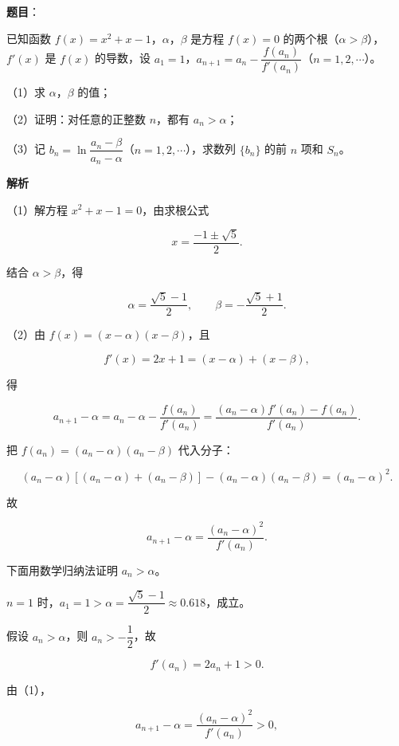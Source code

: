 \begin{answer}

\textbf{题目}：

已知函数 $f(x)=x^2+x-1$，$\alpha$，$\beta$ 是方程 $f(x)=0$ 的两个根（$\alpha>\beta$），$f'(x)$ 是 $f(x)$ 的导数，设 $a_1=1$，$a_{n+1}=a_n-\dfrac{f(a_n)}{f'(a_n)}$（$n=1,2,\cdots$）。

（1）求 $\alpha$，$\beta$ 的值；

（2）证明：对任意的正整数 $n$，都有 $a_n>\alpha$；

（3）记 $b_n=\ln\dfrac{a_n-\beta}{a_n-\alpha}$（$n=1,2,\cdots$），求数列 $\{b_n\}$ 的前 $n$ 项和 $S_n$。

\textbf{解析}

（1）解方程 $x^2+x-1=0$，由求根公式

\nopagebreak[4]
\[x=\frac{-1\pm\sqrt5}{2}.\]

结合 $\alpha>\beta$，得

\nopagebreak[4]
\[\alpha=\frac{\sqrt5-1}{2},\qquad \beta=-\frac{\sqrt5+1}{2}.\]

（2）由 $f(x)=(x-\alpha)(x-\beta)$，且

\nopagebreak[4]
\[f'(x)=2x+1=(x-\alpha)+(x-\beta),\]

得

\nopagebreak[4]
\[a_{n+1}-\alpha=a_n-\alpha-\frac{f(a_n)}{f'(a_n)}=\frac{(a_n-\alpha)f'(a_n)-f(a_n)}{f'(a_n)}.\]

把 $f(a_n)=(a_n-\alpha)(a_n-\beta)$ 代入分子：

\nopagebreak[4]
\[(a_n-\alpha)[(a_n-\alpha)+(a_n-\beta)]-(a_n-\alpha)(a_n-\beta)=(a_n-\alpha)^2.\]

故

\nopagebreak[4]
\[a_{n+1}-\alpha=\frac{(a_n-\alpha)^2}{f'(a_n)}.\tag{1}\]

下面用数学归纳法证明 $a_n>\alpha$。

$n=1$ 时，$a_1=1>\alpha=\dfrac{\sqrt5-1}{2}\approx0.618$，成立。

假设 $a_n>\alpha$，则 $a_n>-\dfrac12$，故

\nopagebreak[4]
\[f'(a_n)=2a_n+1>0.\]

由（1），

\nopagebreak[4]
\[a_{n+1}-\alpha=\frac{(a_n-\alpha)^2}{f'(a_n)}>0,\]


\end{answer}

